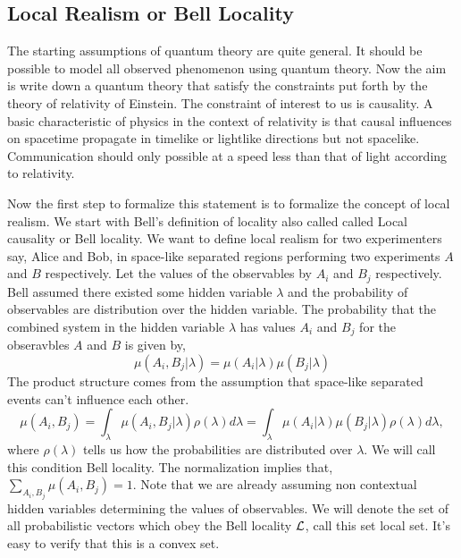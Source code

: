 \documentclass[11pt]{report}
\begin{document}
\subsection{Local Realism or Bell Locality}
The starting assumptions of quantum theory are quite general. It should be possible to model all observed phenomenon using quantum theory. Now the aim is write down a quantum theory that satisfy the constraints put forth by the theory of relativity of Einstein. The constraint of interest to us is causality. A basic characteristic of physics in the context of relativity is that causal influences on spacetime propagate in timelike or lightlike directions but not spacelike. Communication should only possible at a speed less than that of light according to relativity.

Now the first step to formalize this statement is to formalize the concept of local realism. We start with Bell's definition of locality also called called Local causality or Bell locality. We want to define local realism for two experimenters say, Alice and Bob, in space-like separated regions performing two experiments $A$ and $B$ respectively. Let the values of the observables by $A_i$ and $B_j$ respectively. Bell assumed there existed some hidden variable $\lambda$ and the probability of observables are distribution over the hidden variable. The probability that the combined system in the hidden variable $\lambda$ has values $A_i$ and $B_j$ for the obseravbles $A$ and $B$ is given by,
$$\mu(A_i,B_j|\lambda)=\mu(A_i|\lambda)\mu(B_j|\lambda)$$
The product structure comes from the assumption that space-like separated events can't influence each other. 
$$\mu(A_i,B_j)=\int_\lambda \mu(A_i,B_j|\lambda)\rho(\lambda)d\lambda=\int_\lambda \mu(A_i|\lambda)\mu(B_j|\lambda)\rho(\lambda)d\lambda,$$
where $\rho(\lambda)$ tells us how the probabilities are distributed over $\lambda$. We will call this condition Bell locality. The normalization implies that,
$\textstyle\sum_{A_i,B_j} \mu(A_i,B_j)=1.$
Note that we are already assuming non contextual hidden variables determining the values of observables. We will denote the set of all probabilistic vectors which obey the Bell locality $\mathcal {L}$, call this set local set. It's easy to verify that this is a convex set.
\end{document}
